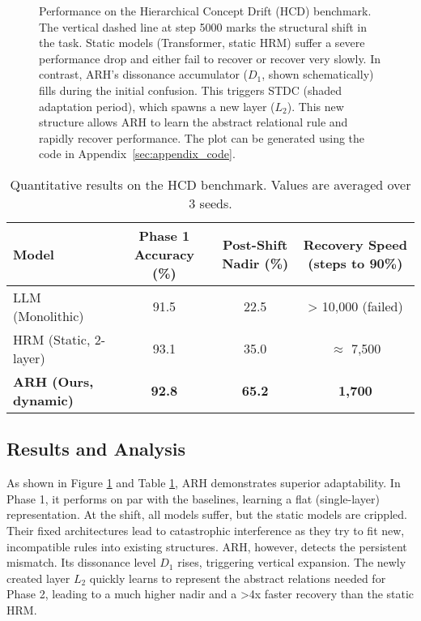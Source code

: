 \documentclass{article}
\begin{document}
\begin{figure}[h!]
    \centering
    \caption{Performance on the Hierarchical Concept Drift (HCD) benchmark. The vertical dashed line at step 5000 marks the structural shift in the task. Static models (Transformer, static HRM) suffer a severe performance drop and either fail to recover or recover very slowly. In contrast, ARH's dissonance accumulator ($D_1$, shown schematically) fills during the initial confusion. This triggers STDC (shaded adaptation period), which spawns a new layer ($L_2$). This new structure allows ARH to learn the abstract relational rule and rapidly recover performance. The plot can be generated using the code in Appendix~\ref{sec:appendix_code}.}
    \label{fig:performance_plot}
\end{figure}

\begin{table}[h!]
\centering
\caption{Quantitative results on the HCD benchmark. Values are averaged over 3 seeds.}
\label{tab:results_hcd}
\begin{tabular}{@{}lccc@{}}
\toprule
Model & Phase 1 Accuracy (\%) & Post-Shift Nadir (\%) & Recovery Speed (steps to 90\%) \\
\midrule
LLM (Monolithic) & 91.5 & 22.5 & > 10,000 (failed) \\
HRM (Static, 2-layer) & 93.1 & 35.0 & $\approx$ 7,500 \\
\textbf{ARH (Ours, dynamic)} & \textbf{92.8} & \textbf{65.2} & \textbf{1,700} \\
\bottomrule
\end{tabular}
\end{table}

\subsection{Results and Analysis}
As shown in Figure \ref{fig:performance_plot} and Table \ref{tab:results_hcd}, ARH demonstrates superior adaptability. In Phase 1, it performs on par with the baselines, learning a flat (single-layer) representation. At the shift, all models suffer, but the static models are crippled. Their fixed architectures lead to catastrophic interference as they try to fit new, incompatible rules into existing structures. ARH, however, detects the persistent mismatch. Its dissonance level $D_1$ rises, triggering vertical expansion. The newly created layer $L_2$ quickly learns to represent the abstract relations needed for Phase 2, leading to a much higher nadir and a >4x faster recovery than the static HRM.
\end{document}

